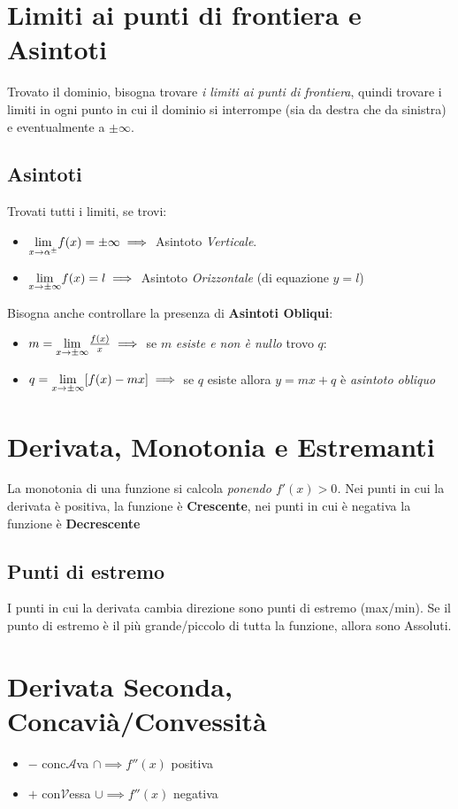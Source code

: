 \documentclass[12pt, a4paper, openany]{book}
\begin{document}
\section{Limiti ai punti di frontiera e Asintoti}
Trovato il dominio, bisogna trovare \emph{i limiti ai punti di frontiera},
quindi trovare i limiti in ogni punto in cui il dominio si interrompe (sia da destra che da sinistra) e eventualmente a $\pm \infty$.

\subsection{Asintoti}
Trovati tutti i limiti, se trovi:
\begin{itemize}
	\item $\underset{x \to \alpha^\pm}{\lim} f(x) = \pm \infty \implies$ Asintoto \emph{Verticale}.
	\item $\underset{x \to \pm \infty}{\lim} f(x) = l \implies$ Asintoto \emph{Orizzontale} (di equazione $y=l$)
\end{itemize}
Bisogna anche controllare la presenza di \textbf{Asintoti Obliqui}:
\begin{itemize}
	\item $m = \underset{x \to \pm \infty}{\lim} \frac{f(x)}{x} \implies$ se $m$ \emph{esiste e non è nullo} trovo $q$:
	\item $q = \underset{x \to \pm \infty}{\lim} [f(x) - mx]\implies$  se $q$ esiste allora $y=mx+q$ è \emph{asintoto obliquo}
\end{itemize}

\section{Derivata, Monotonia e Estremanti}
La monotonia di una funzione si calcola \emph{ponendo $f'(x)>0$.}
Nei punti in cui la derivata è positiva, la funzione è \textbf{Crescente}, nei punti in cui è negativa la funzione è \textbf{Decrescente}
\subsection{Punti di estremo} I punti in cui la derivata cambia direzione sono punti di estremo (max/min).
Se il punto di estremo è il più grande/piccolo di tutta la funzione, allora sono Assoluti.

\section{Derivata Seconda, Concavià/Convessità}
\begin{itemize}
	\item $-$ conc$\mathcal{A}$va $\cap \implies f''(x)$ positiva
	\item $+$ con$\mathcal{V}$essa $\cup \implies f''(x)$ negativa
\end{itemize}
\end{document}
